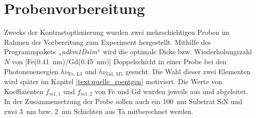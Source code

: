 

\section{Probenvorbereitung}
Zwecks der Kontrastoptimierung wurden zwei mehrschichtigen Proben im Rahmen der Vorbereitung zum Experiment hergestellt. Mithilfe des Programmpakets „\emph{udkm1Dsim}“ \cite{schick_udkm1dsim_2021} wird die optimale Dicke bzw. Wiederholungszahl $N$ von [Fe(\SI{0.41}{\nano\meter})/Gd(\SI{0.45}{\nano\meter})] Doppelschicht in einer Probe bei den Photonenenergien $h\nu_{\text{Fe, L3}}$ und $h\nu_{\text{Gd, M5}}$ gesucht. Die Wahl dieser zwei Elementen wird später im Kapitel \ref{text:quelle_roentgen} motiviert. Die Werte von Koeffizienten $f_{m1,1}$ und $f_{m1,2}$ von Fe und Gd wurden jeweils aus \cite[Abb. 4]{kortright_resonant_2000} und \cite[Abb. 2]{prieto_x-ray_2005} abgeleitet. In der Zusammensetzung der Probe sollen auch ein \SI{100}{\nano\meter} Substrat SiN und zwei \SI{3}{\nano\meter} bzw. \SI{2}{\nano\meter} Schichten aus Ta mitberechnet werden.


